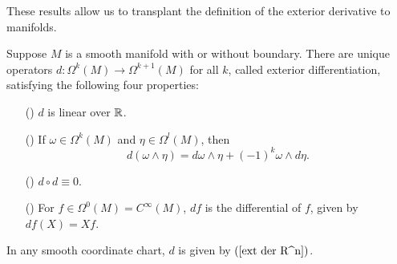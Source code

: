 These results allow us to transplant the definition of the exterior derivative to manifolds.
\begin{theorem}
Suppose $M$ is a smooth manifold with or without boundary. There are unique operators $d:\Omega^k(M)\to\Omega^{k+1}(M)$ for all $k$, called exterior differentiation, satisfying the following four properties:
\begin{itemize}
\item[(\rmnum{1})] $d$ is linear over $\mathbb{R}$.
\item[(\rmnum{2})] If $\omega\in\Omega^k(M)$ and $\eta\in\Omega^l(M)$, then
\[d(\omega\wedge\eta)=d\omega\wedge\eta+(-1)^k\omega\wedge d\eta.\]
\item[(\rmnum{3})] $d\circ d\equiv0$.
\item[(\rmnum{4})] For $f\in\Omega^0(M)=C^\infty(M)$, $df$ is the differential of $f$, given by $df(X)=Xf$.
\end{itemize}
In any smooth coordinate chart, $d$ is given by $(\ref{ext der R^n})$.
\end{theorem}
